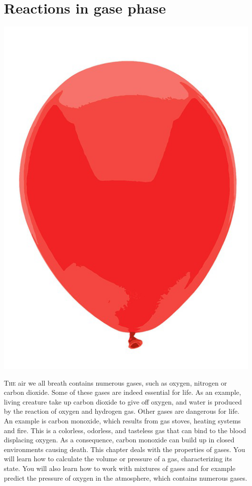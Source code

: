\documentclass[main.tex]{subfiles}
\begin{document}
\linenumbers


\chapter[Gases ]{Reactions in gase phase}

\begin{marginfigure}
      \includegraphics{chapter8/figure1}
   \end{marginfigure}
\lettrine[lines=4]{\color{black!45}T}{he} air we all breath contains numerous gases, such as oxygen, nitrogen or carbon dioxide. Some of these gases are indeed essential for life. As an example, living creature take up carbon dioxide to give off oxygen, and water is produced by the reaction of oxygen and hydrogen gas. Other gases are dangerous for life. An example is carbon monoxide, which results from gas stoves, heating systems and fire. This is a colorless, odorless, and tasteless gas that can bind to the blood displacing oxygen. As a consequence, carbon monoxide can build up in closed environments causing death. This chapter deals with the properties of gases. You will learn how to calculate the volume or pressure of a gas, characterizing its state. You will also learn how to work with mixtures of gases and for example predict the pressure of oxygen in the atmosphere, which contains numerous gases.
\end{document}

